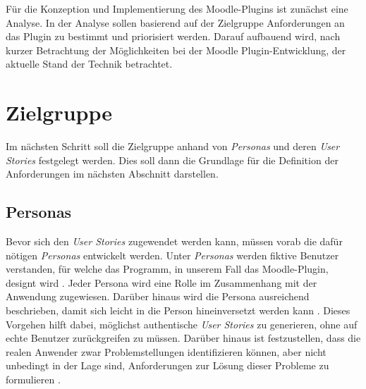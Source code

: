 \label{cha:analyse}
Für die Konzeption und Implementierung des Moodle-Plugins ist zunächst eine Analyse. In der Analyse sollen basierend auf der Zielgruppe Anforderungen an das Plugin zu bestimmt und priorisiert werden. Darauf aufbauend wird, nach kurzer Betrachtung der Möglichkeiten bei der Moodle Plugin-Entwicklung, der aktuelle Stand der Technik betrachtet.



\section{Zielgruppe}
Im nächsten Schritt soll die Zielgruppe anhand von \textit{Personas} und deren \textit{User Stories} festgelegt werden. Dies soll dann die Grundlage für die Definition der Anforderungen im nächsten Abschnitt darstellen.


\subsection{Personas}
\label{sec:personas}
Bevor sich den \textit{User Stories} zugewendet werden kann, müssen vorab die dafür nötigen \textit{Personas} entwickelt werden. Unter \textit{Personas} werden fiktive Benutzer verstanden, für welche das Programm, in unserem Fall das Moodle-Plugin, designt wird \citep{cooper2004inmates}. Jeder Persona wird eine Rolle im Zusammenhang mit der Anwendung zugewiesen. Darüber hinaus wird die Persona ausreichend beschrieben, damit sich leicht in die Person hineinversetzt werden kann \citep{cohn2004user}. Dieses Vorgehen hilft dabei, möglichst authentische \textit{User Stories} zu generieren, ohne auf echte Benutzer zurückgreifen zu müssen. Darüber hinaus ist festzustellen, dass die realen Anwender zwar Problemstellungen identifizieren können, aber nicht unbedingt in der Lage sind, Anforderungen zur Lösung dieser Probleme zu formulieren \citep{cooper2004inmates}.

\par
\begingroup
\leftskip=1cm
\rightskip=1.5cm
\noindent

